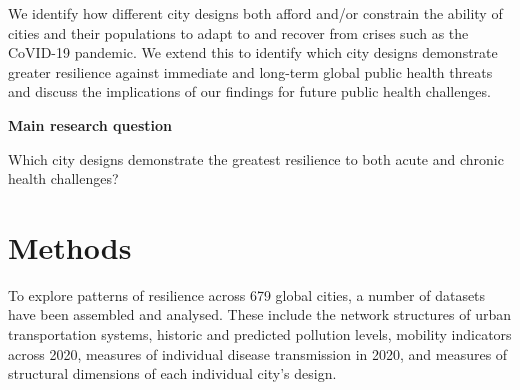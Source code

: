 \documentclass[preprint,12pt]{elsarticle}
\begin{document}
We identify how different city designs both afford and/or constrain the ability of cities and their populations to adapt to and recover from crises such as the CoVID-19 pandemic. We extend this to identify which city designs demonstrate greater resilience against immediate and long-term global public health threats and discuss the implications of our findings for future public health challenges.


\textbf{Main research question}

 Which city designs demonstrate the greatest resilience to both acute and chronic health challenges?








\section*{Methods}

To explore patterns of resilience across 679 global cities, a number of datasets have been assembled and analysed. These include the network structures of urban transportation systems, historic and predicted pollution levels, mobility indicators across 2020, measures of individual disease transmission in 2020, and measures of structural dimensions of each individual city's design.
\end{document}

